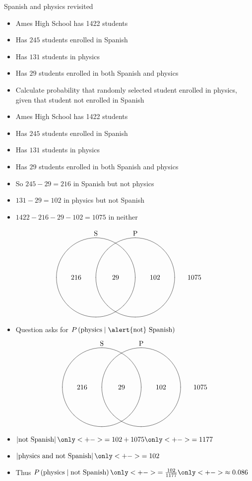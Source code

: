 \documentclass[handout]{beamer}
\theoremstyle{definition}
\begin{document}
\begin{frame}{Spanish and physics revisited}
\begin{itemize}
\item Ames High School has 1422 students
\item Has $245$ students enrolled in Spanish
\item Has $131$ students in physics
\item Has $29$ students enrolled in both Spanish and physics
\item Calculate probability that randomly selected student
enrolled in physics, given that student \alert{not} enrolled in Spanish
\end{itemize}
\end{frame}

\begin{frame}
\begin{itemize}
\item Ames High School has 1422 students
\item Has $245$ students enrolled in Spanish
\item Has $131$ students in physics
\item Has $29$ students enrolled in both Spanish and physics
\item So $245-29=216$ in Spanish but not physics
\item $131-29=102$ in physics but not Spanish
\item $1422-216-29-102=1075$ in neither
\end{itemize}
\[\begin{xy}<1cm,0cm>:
(-1,2)*+!D{\text{S}};
(1,2)*+!D{\text{P}};
(-1,0)*\cir<2cm>{};
(1,0)*\cir<2cm>{};
(0,0)*{29};
(-2,0)*{216};
(2,0)*{102};
(4,0)*{1075};
\end{xy}\]
\end{frame}

\begin{frame}
\begin{itemize}
\item Question asks for $P\left(\text{physics}\mid
\text{\alert{not} Spanish}\right)$
\[\begin{xy}<1cm,0cm>:
(-1,2)*+!D{\text{S}};
(1,2)*+!D{\text{P}};
(-1,0)*\cir<2cm>{};
(1,0)*\cir<2cm>{};
(0,0)*{29};
(-2,0)*{216};
(2,0)*{102};
(4,0)*{1075};
\end{xy}\]
\item $\left|\text{not Spanish}\right|
\only<+->{=102+1075}\only<+->{=1177}$
\item $\left|\text{physics and not Spanish}\right|
\only<+->{=102}$
\item Thus
$P\left(\text{physics}\mid
\text{not Spanish}\right)\only<+->{=\frac{102}{1177}}
\only<+->{\approx 0.086}$
\end{itemize}
\end{frame}
\end{document}
